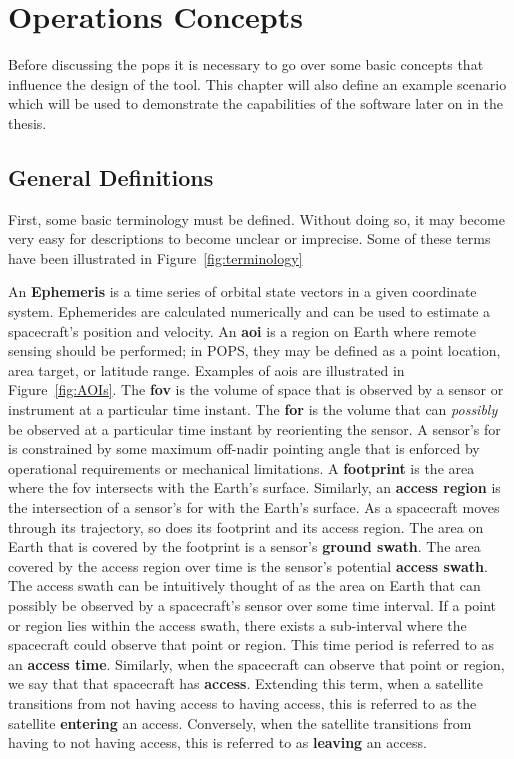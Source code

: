 \glsresetall{} 
\chapter{Operations Concepts}\label{chap:ops}

\lettrine[lines=2, findent=0pt, nindent=5pt]{B}{}efore discussing the
\gls{pops} it is necessary to go over some basic concepts that influence the
design of the tool. This chapter will also define an example scenario which
will be used to demonstrate the capabilities of the software later on in the
thesis.

\section{General Definitions}

First, some basic terminology must be defined.  Without doing so, it may become
very easy for descriptions to become unclear or imprecise. Some of these terms
have been illustrated in Figure~\ref{fig:terminology}

An \textbf{Ephemeris} is a time series of orbital state vectors in a given
coordinate system. Ephemerides are calculated numerically and can be used to
estimate a spacecraft’s position and velocity.  An \textbf{\gls{aoi}} is a
region on Earth where remote sensing should be performed; in POPS, they may be
defined as a point location, area target, or latitude range.  Examples of
\glspl{aoi} are illustrated in Figure~\ref{fig:AOIs}. The \textbf{\gls{fov}} is
the volume of space that is observed by a sensor or instrument at a particular
time instant.  The \textbf{\gls{for}} is the volume that can \textit{possibly}
be observed at a particular time instant by reorienting the sensor. A sensor’s
\gls{for} is constrained by some maximum off-nadir pointing angle that is
enforced by operational requirements or mechanical limitations. A
\textbf{footprint} is the area where the \gls{fov} intersects with the Earth’s
surface.  Similarly, an \textbf{access region} is the intersection of a
sensor’s \gls{for} with the Earth’s surface.  As a spacecraft moves through its
trajectory, so does its footprint and its access region.  The area on Earth
that is covered by the footprint is a sensor’s \textbf{ground swath}. The area
covered by the access region over time is the sensor’s potential \textbf{access
swath}.  The access swath can be intuitively thought of as the area on Earth
that can possibly be observed by a spacecraft’s sensor over some time interval.
If a point or region lies within the access swath, there exists a sub-interval
where the spacecraft could observe that point or region. This time period is
referred to as an \textbf{access time}. Similarly, when the spacecraft can
observe that point or region, we say that that spacecraft has \textbf{access}.
Extending this term, when a satellite transitions from not having access to
having access, this is referred to as the satellite \textbf{entering} an
access. Conversely, when the satellite transitions from having to not having
access, this is referred to as \textbf{leaving} an access. 

